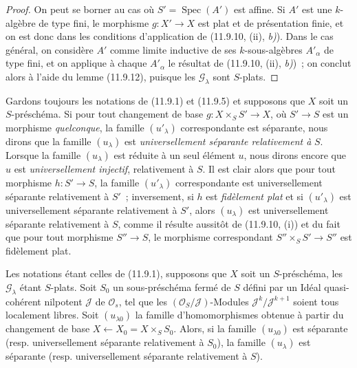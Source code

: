 \begin{proof}
On peut se borner au cas où $S'=\operatorname{Spec}(A')$ est affine. Si $A'$
est une $k$-algèbre de type fini, le morphisme $g:X'\to X$ est plat et de
présentation finie, et on est donc dans les conditions d'application de
(11.9.10, (ii), \emph{b)}). Dans le cas général, on considère $A'$ comme limite
inductive de ses $k$-sous-algèbres $A'_\alpha$ de type fini, et on applique à
chaque $A'_\alpha$ le résultat de (11.9.10, (ii), \emph{b)})~; on conclut alors à
l'aide du lemme (11.9.12), puisque les $\mathcal G_\lambda$ sont $S$-plats.
\end{proof}

\begin{env}[11.9.14]
\label{IV.11.9.14-fr}
Gardons toujours les notations de (11.9.1) et (11.9.5) et supposons que $X$
soit un $S$-préschéma. Si pour tout changement de base
$g:X\times_S S'\to X$, où $S'\to S$ est un morphisme \emph{quelconque}, la famille
$(u'_\lambda)$ correspondante est séparante, nous dirons que la famille
$(u_\lambda)$ est \emph{universellement séparante relativement à} $S$.
Lorsque la famille $(u_\lambda)$ est réduite à un seul élément $u$, nous
dirons encore que $u$ est \emph{universellement injectif}, relativement à
$S$. Il est clair alors que pour tout morphisme $h:S'\to S$, la famille
$(u'_\lambda)$ correspondante est universellement séparante relativement à
$S'$~; inversement, si $h$ est \emph{fidèlement plat} et si $(u'_\lambda)$ est
universellement séparante relativement à $S'$, alors $(u_\lambda)$ est
universellement séparante relativement à $S$, comme il résulte aussitôt de
(11.9.10, (i)) et du fait que pour tout morphisme $S''\to S$, le morphisme
correspondant $S''\times_S S'\to S''$ est fidèlement plat.
\end{env}


\begin{proposition}[11.9.15]
\label{IV.11.9.15-fr}
Les notations étant celles de \textup{(11.9.1)}, supposons que $X$ soit un
$S$-préschéma, les $\mathcal G_\lambda$ étant $S$-plats. Soit $S_0$ un
sous-préschéma fermé de $S$ défini par un Idéal quasi-cohérent nilpotent
$\mathcal J$ de $\mathcal O_s$, tel que les
$(\mathcal O_S/\mathcal J)$-Modules $\mathcal J^k/\mathcal J^{k+1}$ soient
tous localement libres. Soit $(u_{\lambda0})$ la famille d'homomorphismes
obtenue à partir du changement de base
$X\leftarrow X_0=X\times_S S_0$. Alors, si la famille $(u_{\lambda0})$ est
séparante \textup{(resp.} universellement séparante relativement à $S_0$\textup{)}, la famille
$(u_\lambda)$ est séparante \textup{(resp.} universellement séparante relativement à
$S$\textup{)}.
\end{proposition}

